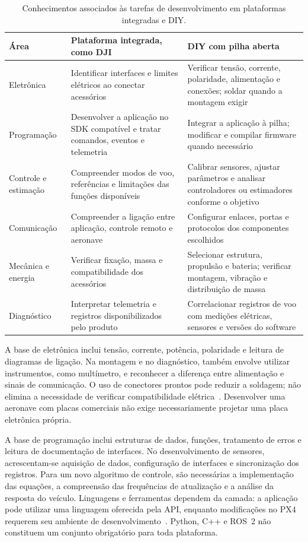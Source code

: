 \documentclass[11pt,a4paper,oneside]{book}
\numberwithin{equation}{chapter}
\begin{document}
\FloatBarrier
\begin{table}[htbp]
\centering\small
\caption{Conhecimentos associados às tarefas de desenvolvimento em plataformas integradas e DIY.}
\label{tab:competencias}
\begin{tabularx}{\textwidth}{@{}>{\raggedright\arraybackslash}p{2.6cm}YY@{}}
\toprule
Área & Plataforma integrada, como DJI & DIY com pilha aberta \\
\midrule
Eletrônica & Identificar interfaces e limites elétricos ao conectar acessórios & Verificar tensão, corrente, polaridade, alimentação e conexões; soldar quando a montagem exigir \\
Programação & Desenvolver a aplicação no SDK compatível e tratar comandos, eventos e telemetria & Integrar a aplicação à pilha; modificar e compilar firmware quando necessário \\
Controle e estimação & Compreender modos de voo, referências e limitações das funções disponíveis & Calibrar sensores, ajustar parâmetros e analisar controladores ou estimadores conforme o objetivo \\
Comunicação & Compreender a ligação entre aplicação, controle remoto e aeronave & Configurar enlaces, portas e protocolos dos componentes escolhidos \\
Mecânica e energia & Verificar fixação, massa e compatibilidade dos acessórios & Selecionar estrutura, propulsão e bateria; verificar montagem, vibração e distribuição de massa \\
Diagnóstico & Interpretar telemetria e registros disponibilizados pelo produto & Correlacionar registros de voo com medições elétricas, sensores e versões do software \\
\bottomrule
\end{tabularx}
\end{table}

A base de eletrônica inclui tensão, corrente, potência, polaridade e leitura de diagramas de ligação. Na montagem e no diagnóstico, também envolve utilizar instrumentos, como multímetro, e reconhecer a diferença entre alimentação e sinais de comunicação. O uso de conectores prontos pode reduzir a soldagem; não elimina a necessidade de verificar compatibilidade elétrica~\cite{px4montagem}. Desenvolver uma aeronave com placas comerciais não exige necessariamente projetar uma placa eletrônica própria.

A base de programação inclui estruturas de dados, funções, tratamento de erros e leitura de documentação de interfaces. No desenvolvimento de sensores, acrescentam-se aquisição de dados, configuração de interfaces e sincronização dos registros. Para um novo algoritmo de controle, são necessárias a implementação das equações, a compreensão das frequências de atualização e a análise da resposta do veículo. Linguagens e ferramentas dependem da camada: a aplicação pode utilizar uma linguagem oferecida pela API, enquanto modificações no PX4 requerem seu ambiente de desenvolvimento~\cite{px4desenvolvimento}. Python, C++ e ROS~2 não constituem um conjunto obrigatório para toda plataforma.
\end{document}
